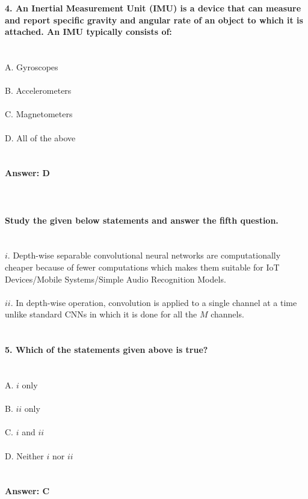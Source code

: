 \documentclass[prl,twocolumn,showpacs,preprintnumbers,superscriptaddress]{revtex4}
\theoremstyle{plain}
\theoremstyle{definition}
\begin{document}
\begin{widetext}
\textbf{4. An Inertial Measurement Unit (IMU) is a device that can measure and report specific gravity and angular rate of an object to which it is attached. An IMU typically consists of:}
\\
\\
\\
A. Gyroscopes
\\
\\
B. Accelerometers
\\
\\
C. Magnetometers 
\\
\\
D. All of the above
\\
\\
\\
\textbf{Answer: D}
\\
\\
\\
\\
\textbf{Study the given below statements and answer the fifth question.}
\\
\\
\\
$i$. Depth-wise separable convolutional neural networks are computationally cheaper because of fewer computations which makes them suitable for IoT Devices/Mobile Systems/Simple Audio Recognition Models.
\\
\\
$ii$. In depth-wise operation, convolution is applied to a single channel at a time unlike standard CNNs in which it is done for all the $M$ channels.
\\
\\
\\
\textbf{5. Which of the statements given above is true?}
\\
\\
\\
A. $i$ only
\\
\\
B. $ii$ only
\\
\\
C. $i$ and $ii$
\\
\\
D. Neither $i$ nor $ii$
\\
\\
\\
\textbf{Answer: C}
\\
\\
\\
\\
\\
\\
\\
\\
\\
\end{widetext}
\end{document}
